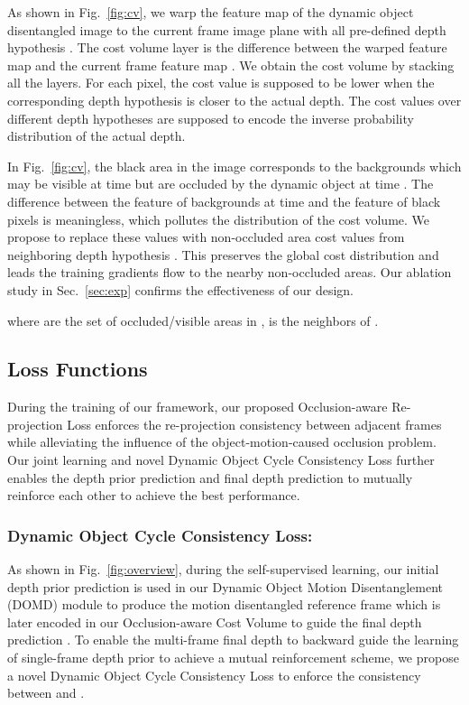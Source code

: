 \documentclass[runningheads]{llncs}
\begin{document}
As shown in Fig.~\ref{fig:cv}, we warp the feature map  of the dynamic object disentangled image  to the current frame image plane with all pre-defined depth hypothesis . The cost volume layer  is the  difference between the warped feature map  and the current frame feature map . We obtain the cost volume  by stacking all the layers. For each pixel, the cost value is supposed to be lower when the corresponding depth hypothesis is closer to the actual depth. The cost values over different depth hypotheses are supposed to encode the inverse probability distribution of the actual depth.


In Fig.~\ref{fig:cv}, the black area in the image  corresponds to the backgrounds which may be visible at time  but are occluded by the dynamic object at time . The  difference between the feature of backgrounds at time  and the feature of black pixels is meaningless, which pollutes the distribution of the cost volume. We propose to replace these values with non-occluded area cost values from neighboring depth hypothesis . This preserves the global cost distribution and leads the training gradients flow to the nearby non-occluded areas. Our ablation study in Sec.~\ref{sec:exp} confirms the effectiveness of our design.

where  are the set of occluded/visible areas in ,  is the neighbors of .

\subsection{Loss Functions}
\label{sec:loss}
During the training of our framework, our proposed Occlusion-aware Re-projection Loss  enforces the re-projection consistency between adjacent frames while alleviating the influence of the object-motion-caused occlusion problem. Our joint learning and novel Dynamic Object Cycle Consistency Loss  further enables the depth prior prediction  and final depth prediction  to mutually reinforce each other to achieve the best performance.

\subsubsection{Dynamic Object Cycle Consistency Loss:}
As shown in Fig.~\ref{fig:overview}, during the self-supervised learning, our initial depth prior prediction  is used in our Dynamic Object Motion Disentanglement (DOMD) module to produce the motion disentangled reference frame  which is later encoded in our Occlusion-aware Cost Volume to guide the final depth prediction . To enable the multi-frame final depth  to backward guide the learning of single-frame depth prior  to achieve a mutual reinforcement scheme, we propose a novel Dynamic Object Cycle Consistency Loss  to enforce the consistency between  and .
\end{document}
